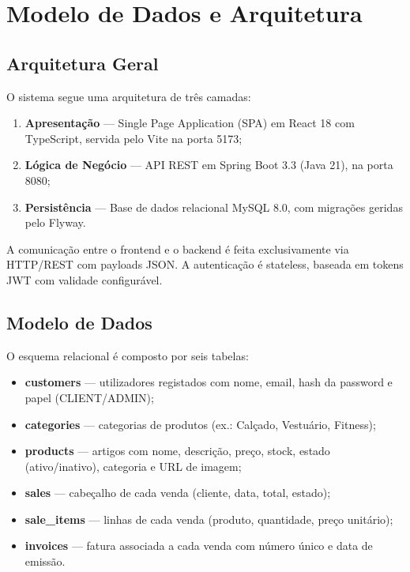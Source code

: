 \section{Modelo de Dados e Arquitetura}
\label{sec:design}

\subsection{Arquitetura Geral}

O sistema segue uma arquitetura de três camadas:

\begin{enumerate}
    \item \textbf{Apresentação} — Single Page Application (SPA) em React 18 com TypeScript, servida pelo Vite na porta 5173;
    \item \textbf{Lógica de Negócio} — API REST em Spring Boot 3.3 (Java 21), na porta 8080;
    \item \textbf{Persistência} — Base de dados relacional MySQL 8.0, com migrações geridas pelo Flyway.
\end{enumerate}

A comunicação entre o frontend e o backend é feita exclusivamente via HTTP/REST com payloads JSON. A autenticação é stateless, baseada em tokens JWT com validade configurável.

\subsection{Modelo de Dados}

O esquema relacional é composto por seis tabelas:

\begin{itemize}
    \item \textbf{customers} — utilizadores registados com nome, email, hash da password e papel (CLIENT/ADMIN);
    \item \textbf{categories} — categorias de produtos (ex.: Calçado, Vestuário, Fitness);
    \item \textbf{products} — artigos com nome, descrição, preço, stock, estado (ativo/inativo), categoria e URL de imagem;
    \item \textbf{sales} — cabeçalho de cada venda (cliente, data, total, estado);
    \item \textbf{sale\_items} — linhas de cada venda (produto, quantidade, preço unitário);
    \item \textbf{invoices} — fatura associada a cada venda com número único e data de emissão.
\end{itemize}

